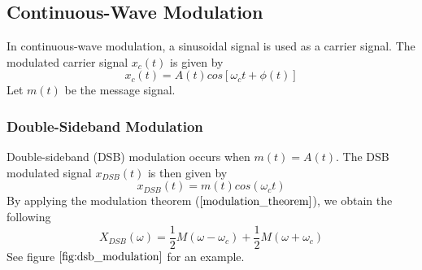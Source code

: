 \documentclass[]{article}
\begin{document}
\subsection{Continuous-Wave Modulation}
In continuous-wave modulation, a sinusoidal signal is used as a carrier signal. The modulated carrier signal $x_{c}(t)$ is given by
\begin{equation} x_{c}(t) = A(t)cos[\omega_{c}t + \phi (t)] \label{cw_carrier_signal} \end{equation}
Let $m(t)$ be the message signal.
\subsubsection{Double-Sideband Modulation}
Double-sideband (DSB) modulation occurs when $m(t) = A(t)$. The DSB modulated signal $x_{DSB}(t)$ is then given by
\begin{equation} x_{DSB}(t) = m(t)cos(\omega_{c}t) \label{dsb_carrier_signal} \end{equation}
By applying the modulation theorem ($\ref{modulation_theorem}$), we obtain the following
\begin{equation} X_{DSB}(\omega) = \frac{1}{2}M(\omega - \omega_{c}) + \frac{1}{2}M(\omega + \omega_{c}) \label{dsb_fourier_transform} \end{equation}
See figure $\ref{fig:dsb_modulation}$ for an example.
\end{document}
